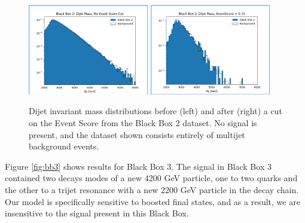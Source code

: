 \documentclass[letterpaper,11pt]{article}
\begin{document}
\begin{figure}[h!]
	\begin{center}
		\includegraphics[width=0.47\textwidth]{imgs/BB2.png}
		\includegraphics[width=0.47\textwidth]{imgs/BB2_Cut.png}
	\end{center}
	\caption{Dijet invariant mass distributions before (left) and after (right) a cut on the Event Score from the Black Box 2 dataset. No signal is present, and the dataset shown consists entirely of multijet background events.}
	\label{fig:bb2}
\end{figure}

Figure \ref{fig:bb3} shows results for Black Box 3. The signal in Black Box 3 contained two decays modes of a new 4200 GeV particle, one to two quarks and the other to a trijet resonance with a new 2200 GeV particle in the decay chain. Our model is specifically sensitive to boosted final states, and as a result, we are insensitive to the signal present in this Black Box. 
\end{document}
